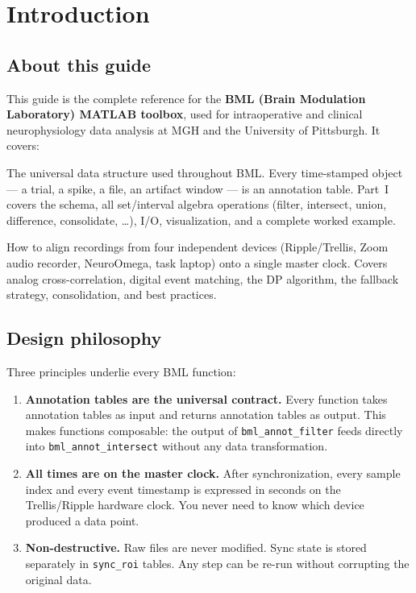 \documentclass[11pt, a4paper]{report}
\begin{document}
\chapter*{Introduction}

\section*{About this guide}

This guide is the complete reference for the \textbf{BML (Brain Modulation Laboratory) MATLAB toolbox}, used for intraoperative and clinical neurophysiology data analysis at MGH and the University of Pittsburgh. It covers:

\begin{description}[leftmargin=2cm,style=nextline]
  \item[Part~I: Annotation Tables] The universal data structure used throughout BML. Every time-stamped object --- a trial, a spike, a file, an artifact window --- is an annotation table. Part~I covers the schema, all set/interval algebra operations (filter, intersect, union, difference, consolidate, \ldots), I/O, visualization, and a complete worked example.
  \item[Part~II: Synchronization] How to align recordings from four independent devices (Ripple/Trellis, Zoom audio recorder, NeuroOmega, task laptop) onto a single master clock. Covers analog cross-correlation, digital event matching, the DP algorithm, the fallback strategy, consolidation, and best practices.
\end{description}

\section*{Design philosophy}

Three principles underlie every BML function:

\begin{enumerate}
  \item \textbf{Annotation tables are the universal contract.} Every function takes annotation tables as input and returns annotation tables as output. This makes functions composable: the output of \texttt{bml\_annot\_filter} feeds directly into \texttt{bml\_annot\_intersect} without any data transformation.
  \item \textbf{All times are on the master clock.} After synchronization, every sample index and every event timestamp is expressed in seconds on the Trellis/Ripple hardware clock. You never need to know which device produced a data point.
  \item \textbf{Non-destructive.} Raw files are never modified. Sync state is stored separately in \texttt{sync\_roi} tables. Any step can be re-run without corrupting the original data.
\end{enumerate}
\end{document}
